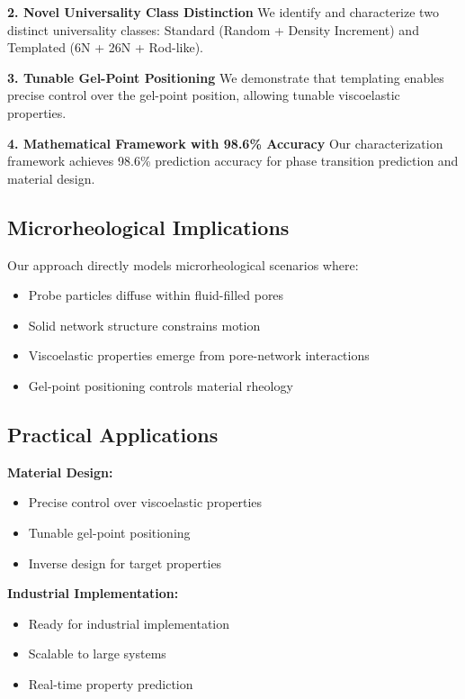 \documentclass[11pt]{article}
\begin{document}
\textbf{2. Novel Universality Class Distinction}
We identify and characterize two distinct universality classes: Standard (Random + Density Increment) and Templated (6N + 26N + Rod-like).

\textbf{3. Tunable Gel-Point Positioning}
We demonstrate that templating enables precise control over the gel-point position, allowing tunable viscoelastic properties.

\textbf{4. Mathematical Framework with 98.6\% Accuracy}
Our characterization framework achieves 98.6\% prediction accuracy for phase transition prediction and material design.

\subsection{Microrheological Implications}

Our approach directly models microrheological scenarios where:
\begin{itemize}
    \item Probe particles diffuse within fluid-filled pores
    \item Solid network structure constrains motion
    \item Viscoelastic properties emerge from pore-network interactions
    \item Gel-point positioning controls material rheology
\end{itemize}

\subsection{Practical Applications}

\textbf{Material Design:}
\begin{itemize}
    \item Precise control over viscoelastic properties
    \item Tunable gel-point positioning
    \item Inverse design for target properties
\end{itemize}

\textbf{Industrial Implementation:}
\begin{itemize}
    \item Ready for industrial implementation
    \item Scalable to large systems
    \item Real-time property prediction
\end{itemize}
\end{document}
